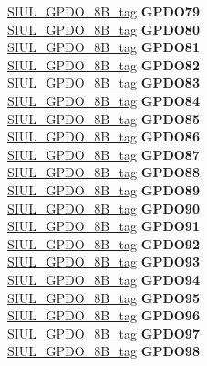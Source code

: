\begin{DoxyCompactItemize}
\begin{tabbing}
\>\>\mbox{\hyperlink{unionSIUL__GPDO__8B__tag}{SIUL\_GPDO\_8B\_tag}} {\bfseries GPDO79}\\
\>\>\mbox{\hyperlink{unionSIUL__GPDO__8B__tag}{SIUL\_GPDO\_8B\_tag}} {\bfseries GPDO80}\\
\>\>\mbox{\hyperlink{unionSIUL__GPDO__8B__tag}{SIUL\_GPDO\_8B\_tag}} {\bfseries GPDO81}\\
\>\>\mbox{\hyperlink{unionSIUL__GPDO__8B__tag}{SIUL\_GPDO\_8B\_tag}} {\bfseries GPDO82}\\
\>\>\mbox{\hyperlink{unionSIUL__GPDO__8B__tag}{SIUL\_GPDO\_8B\_tag}} {\bfseries GPDO83}\\
\>\>\mbox{\hyperlink{unionSIUL__GPDO__8B__tag}{SIUL\_GPDO\_8B\_tag}} {\bfseries GPDO84}\\
\>\>\mbox{\hyperlink{unionSIUL__GPDO__8B__tag}{SIUL\_GPDO\_8B\_tag}} {\bfseries GPDO85}\\
\>\>\mbox{\hyperlink{unionSIUL__GPDO__8B__tag}{SIUL\_GPDO\_8B\_tag}} {\bfseries GPDO86}\\
\>\>\mbox{\hyperlink{unionSIUL__GPDO__8B__tag}{SIUL\_GPDO\_8B\_tag}} {\bfseries GPDO87}\\
\>\>\mbox{\hyperlink{unionSIUL__GPDO__8B__tag}{SIUL\_GPDO\_8B\_tag}} {\bfseries GPDO88}\\
\>\>\mbox{\hyperlink{unionSIUL__GPDO__8B__tag}{SIUL\_GPDO\_8B\_tag}} {\bfseries GPDO89}\\
\>\>\mbox{\hyperlink{unionSIUL__GPDO__8B__tag}{SIUL\_GPDO\_8B\_tag}} {\bfseries GPDO90}\\
\>\>\mbox{\hyperlink{unionSIUL__GPDO__8B__tag}{SIUL\_GPDO\_8B\_tag}} {\bfseries GPDO91}\\
\>\>\mbox{\hyperlink{unionSIUL__GPDO__8B__tag}{SIUL\_GPDO\_8B\_tag}} {\bfseries GPDO92}\\
\>\>\mbox{\hyperlink{unionSIUL__GPDO__8B__tag}{SIUL\_GPDO\_8B\_tag}} {\bfseries GPDO93}\\
\>\>\mbox{\hyperlink{unionSIUL__GPDO__8B__tag}{SIUL\_GPDO\_8B\_tag}} {\bfseries GPDO94}\\
\>\>\mbox{\hyperlink{unionSIUL__GPDO__8B__tag}{SIUL\_GPDO\_8B\_tag}} {\bfseries GPDO95}\\
\>\>\mbox{\hyperlink{unionSIUL__GPDO__8B__tag}{SIUL\_GPDO\_8B\_tag}} {\bfseries GPDO96}\\
\>\>\mbox{\hyperlink{unionSIUL__GPDO__8B__tag}{SIUL\_GPDO\_8B\_tag}} {\bfseries GPDO97}\\
\>\>\mbox{\hyperlink{unionSIUL__GPDO__8B__tag}{SIUL\_GPDO\_8B\_tag}} {\bfseries GPDO98}\\

\end{tabbing}
\end{DoxyCompactItemize}
